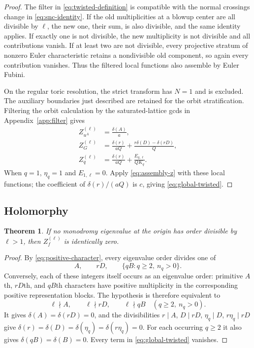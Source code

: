 \documentclass[11pt]{article}
\numberwithin{equation}{section}
\newtheorem{theorem}{Theorem}[section]
\theoremstyle{definition}
\theoremstyle{remark}
\begin{document}
\begin{proof}
The filter in \eqref{eq:twisted-definition} is compatible with
the normal crossings change in \eqref{eq:snc-identity}.
If the old multiplicities at a blowup center are all divisible
by $\ell$, the new one, their sum, is also divisible, and the
same identity applies. If exactly one is not divisible, the
new multiplicity is not divisible and all contributions vanish.
If at least two are not divisible, every projective stratum
of nonzero Euler characteristic retains a nondivisible old
component, so again every contribution vanishes. Thus the
filtered local functions also assemble by Euler Fubini.

On the regular toric resolution, the strict transform has
$N=1$ and is excluded. The auxiliary boundaries just described
are retained for the orbit stratification. Filtering the orbit
calculation by the saturated-lattice gcds in
Appendix~\ref{app:filter} gives
\begin{equation}\label{eq:local-twisted}
 \begin{aligned}
 Z_{u^A}^{(\ell)}&=\frac{\delta(A)}a,\\
 Z_G^{(\ell)}&=\frac{\delta(r)}{aQ}
                  +\frac{r\delta(D)-\delta(rD)}Q,\\
 Z_q^{(\ell)}&=\frac{\delta(r)}{aQ}
                  +\frac{E_{q,\ell}}{QK_q}.
 \end{aligned}
\end{equation}
When $q=1$, $\eta_q=1$ and $E_{1,\ell}=0$.
Apply \eqref{eq:assembly-z} with these local functions;
the coefficient of $\delta(r)/(aQ)$ is $c$, giving
\eqref{eq:global-twisted}.
\end{proof}

\subsection{Holomorphy}

\begin{theorem}\label{thm:holomorphy}
If no monodromy eigenvalue at the origin has order divisible
by $\ell>1$, then $Z_f^{(\ell)}$ is identically zero.
\end{theorem}

\begin{proof}
By \eqref{eq:positive-character}, every eigenvalue order
divides one of
\[
 A,\qquad rD,\qquad \{qB:q\ge2,\ n_q>0\}.
\]
Conversely, each of these integers itself occurs as an
eigenvalue order: primitive $A$th, $rD$th, and $qB$th
characters have positive multiplicity in the corresponding
positive representation blocks. The hypothesis is therefore
equivalent to
\[
 \ell\nmid A,\qquad \ell\nmid rD,\qquad
 \ell\nmid qB\quad(q\ge2,\ n_q>0).
\]
It gives $\delta(A)=\delta(rD)=0$, and the divisibilities
$r\mid A$, $D\mid rD$, $\eta_q\mid D$,
$r\eta_q\mid rD$ give
$\delta(r)=\delta(D)=\delta(\eta_q)
=\delta(r\eta_q)=0$.
For each occurring $q\ge2$ it also gives
$\delta(qB)=\delta(B)=0$.
Every term in \eqref{eq:global-twisted} vanishes.
\end{proof}
\end{document}
